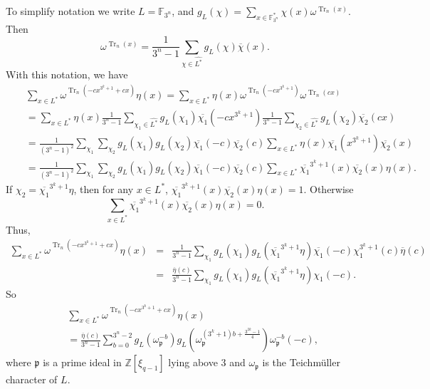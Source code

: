 \documentclass[11pt, reqno]{amsart}
\newcommand{\Ff}{{\mathbb F}}
\newcommand{\Zz}{{\mathbb Z}}
\def\Tr{\operatorname{Tr}}
\def\Tr{\operatorname{Tr}}
\begin{document}
To simplify notation we write $L=\Ff_{3^n}$, and
$g_{L}(\chi)=\sum_{x \in \Ff_{3^n}^*}\chi(x)\omega^{\Tr_n(x)}$. Then
$$\omega^{\Tr_n(x)}=\frac{1}{3^n-1}\sum_{\chi \in \widehat{L^*}}g_{L}(\chi)\overline{\chi}(x).$$
With this notation, we have
\begin{eqnarray*}
&&\sum_{x \in L^*}\omega^{\Tr_n(-cx^{3^k+1}+cx)}\eta(x)=\sum_{x \in L^*}\eta(x)\omega^{\Tr_n(-cx^{3^k+1})}\omega^{\Tr_n(cx)}\\
&&=\sum_{x \in L^*}\eta(x)\frac{1}{3^n-1}\sum_{\chi_1 \in \widehat{L^*}}g_{L}(\chi_1)\overline{\chi_1}(-cx^{3^k+1})\frac{1}{3^n-1}\sum_{\chi_2 \in \widehat{L^*}}g_L(\chi_2)\overline{\chi_2}(cx)\\
&&=\frac{1}{(3^n-1)^2}\sum_{\chi_1}\sum_{\chi_2}g_L(\chi_1)g_L(\chi_2)\overline{\chi_1}(-c)\overline{\chi_2}(c)
\sum_{x \in L^*}\eta(x)\overline{\chi_1}(x^{3^k+1})\overline{\chi_2}(x)\\
&&=\frac{1}{(3^n-1)^2}\sum_{\chi_1}\sum_{\chi_2}g_L(\chi_1)g_L(\chi_2)\overline{\chi_1}(-c)\overline{\chi_2}(c)
\sum_{x \in
L^*}\overline{\chi_1}^{3^k+1}(x)\overline{\chi_2}(x)\eta(x).
\end{eqnarray*}
If $\chi_2=\overline{\chi_1}^{3^k+1}\eta$, then for any $x \in L^*$,
$\overline{\chi_1}^{3^k+1}(x)\overline{\chi_2}(x)\eta(x)=1$.
Otherwise
$$\sum_{x \in L^*}\overline{\chi_1}^{3^k+1}(x)\overline{\chi_2}(x)\eta(x)=0.$$
Thus,
\begin{eqnarray*}
\sum_{x \in L^*}\omega^{\Tr_n(-cx^{3^k+1}+cx)}\eta(x)&=&\frac{1}{3^n-1}\sum_{\chi_1}g_L(\chi_1)g_L(\overline{\chi_1}^{3^k+1}\eta)\overline{\chi_1}(-c)\chi_1^{3^k+1}(c)\overline{\eta}(c)\\
&=&\frac{\overline{\eta}(c)}{3^n-1}\sum_{\chi_1}g_L(\chi_1)g_L(\overline{\chi_1}^{3^k+1}\eta)\chi_1(-c).
\end{eqnarray*}
So
\begin{eqnarray}
&&\sum_{x \in L^*}\omega^{\Tr_n(-cx^{3^k+1}+cx)}\eta(x) \nonumber \\
&&=\frac{\overline{\eta}(c)}{3^n-1}\sum_{b=0}^{3^n-2}g_L(\omega_{\mathfrak{p}}^{-b})g_L(\omega_{\mathfrak{p}}^{(3^k+1)b+\frac{3^{2k}-1}{4}})\omega_{\mathfrak{p}}^{-b}(-c),\label{secsum}
\end{eqnarray}
where ${\mathfrak{p}}$ is a prime ideal in $\Zz[\xi_{q-1}]$ lying
above 3 and $\omega_{\mathfrak{p}}$ is the Teichm\"uller character
of $L$.
\end{document}
